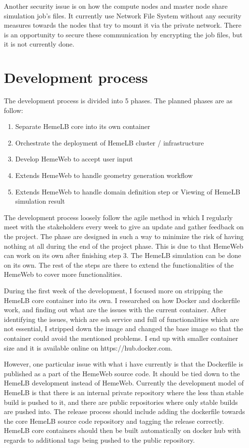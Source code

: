 Another security issue is on how the compute nodes and master node share simulation job's files. It currently use Network File System without any security measures towards the nodes that try to mount it via the private network. There is an opportunity to secure these communication by encrypting the job files, but it is not currently done.


\section{Development process}

The development process is divided into 5 phases. The planned phases are as follow:

\begin{enumerate}
	\item{Separate HemeLB core into its own container}
	\item{Orchestrate the deployment of HemeLB cluster / infrastructure}
	\item{Develop HemeWeb to accept user input}
	\item{Extends HemeWeb to handle geometry generation workflow}
	\item{Extends HemeWeb to handle domain definition step or Viewing of HemeLB simulation result}
\end{enumerate}

The development process loosely follow the agile method in which I regularly meet with the stakeholders every week to give an update and gather feedback on the project. The phase are designed in such a way to minimize the risk of having nothing at all during the end of the project phase. This is due to that HemeWeb can work on its own after finishing step 3. The HemeLB simulation can be done on its own. The rest of the steps are there to extend the functionalities of the HemeWeb to cover more functionalities.

During the first week of the development, I focused more on stripping the HemeLB core container into its own. I researched on how Docker and dockerfile work, and finding out what are the issues with the current container. After identifying the issues, which are ssh service and full of functionalities which are not essential, I stripped down the image and changed the base image so that the container could avoid the mentioned problems. I end up with smaller container size and it is available online on https://hub.docker.com.

However, one particular issue with what i have currently is that the Dockerfile is published as a part of the HemeWeb source code. It should be tied down to the HemeLB development instead of HemeWeb. Currently the development model of HemeLB is that there is an internal private repository where the less than stable build is pushed to it, and there are public repositories where only stable builds are pushed into. The release process should include adding the dockerfile towards the core HemeLB source code repository and tagging the release correctly. HemeLB core containers should then be built automatically on docker hub with regards to additional tags being pushed to the public repository.



